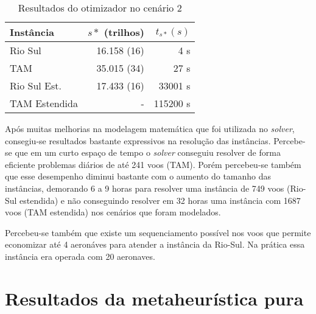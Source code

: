 \begin{table}[ht]
\caption{Resultados do otimizador no cenário 2}\label{tab:cenario2}

\begin{center}
\begin{tabular}{l |r r}
\hline

Instância 			& $s*$ (trilhos) & $t_{s*}(s)$ 
\\
\hline

Rio Sul 			& 16.158 (16) & 4 s		\\
TAM     			& 35.015 (34) & 27 s	\\
Rio Sul Est. 	& 17.433 (16) & 33001 s	 	\\ 
TAM Estendida 		& - 		  & 115200 s\\

\hline
\end{tabular}
\end{center}

\end{table}

Após muitas melhorias na modelagem matemática que foi utilizada no
\textit{solver}, consegiu-se resultados bastante expressivos na resolução das
instâncias. Percebe-se que em um curto espaço de tempo o \textit{solver}
conseguiu resolver de forma eficiente problemas diários de até 241 voos (TAM).
Porém percebeu-se também que esse desempenho diminui bastante com o aumento do
tamanho das instâncias, demorando 6 a 9 horas para resolver uma instância de
749 voos (Rio-Sul estendida) e não conseguindo resolver em 32 horas uma
instância com 1687 voos (TAM estendida) nos cenários que foram modelados.

Percebeu-se também que existe um sequenciamento possível nos voos que permite
economizar até 4 aeronáves para atender a instância da Rio-Sul. Na prática essa
instância era operada com 20 aeronaves.


\section{Resultados da metaheurística pura} \label{result:metaheuristica}


